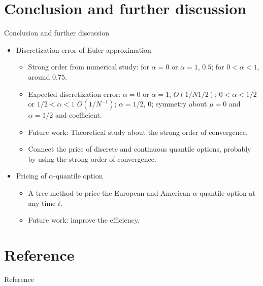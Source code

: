 \documentclass[cjk,10pt]{beamer}
\begin{document}
\section{Conclusion and further discussion}
\begin{frame}{Conclusion and further discussion}
\begin{itemize}
\item
Discretization error of Euler approximation
\begin{itemize}
\item Strong order from numerical study: for $\alpha=0$ or $\alpha=1$, $0.5$; for $0<\alpha<1$, around $0.75$.
\item Expected discretization error: $\alpha=0$ or $\alpha=1$, $O(1/N{1/2})$; $0<\alpha<1/2$ or $1/2<\alpha<1$ $O(1/N^{-1})$; $\alpha=1/2$, $0$; symmetry about $\mu=0$ and $\alpha=1/2$ and coefficient.
\item Future work: Theoretical study about the strong order of convergence.
\item Connect the price of discrete and continuous quantile options, probably by using the strong order of convergence. 
\end{itemize}
\item
Pricing of $\alpha$-quantile option
\begin{itemize} 
\item A tree method to price the European and American $\alpha$-quantile option at any time $t$. 
\item Future work: improve the efficiency. 
\end{itemize}
\end{itemize}
\end{frame}

\section{Reference}
\begin{frame}[allowframebreaks]{Reference}

\end{frame}
\end{document}
